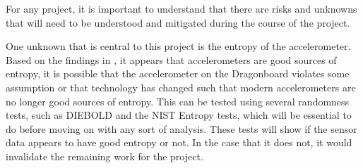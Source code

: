 For any project, it is important to understand that there are risks and unknowns
that will need to be understood and mitigated during the course of the project.

One unknown that is central to this project is the entropy of the accelerometer.
Based on the findings in \cite{voris}, it appears that accelerometers are good
sources of entropy, it is possible that the accelerometer on the Dragonboard
violates some assumption or that technology has changed such that modern
accelerometers are no longer good sources of entropy. This can be tested using
several randomness tests, such as DIEBOLD and the NIST Entropy tests, which will
be essential to do before moving on with any sort of analysis.  These tests will
show if the sensor data appears to have good entropy or not.  In the case that
it does not, it would invalidate the remaining work for the project. 


